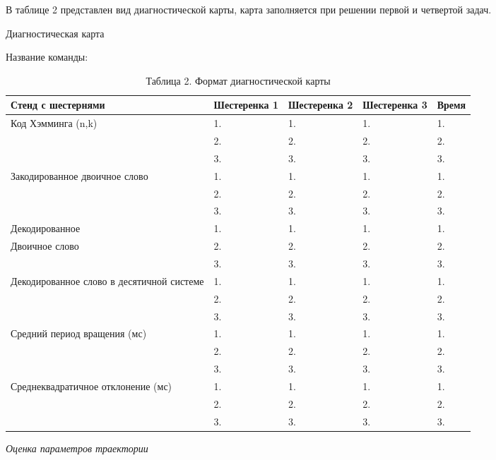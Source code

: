 В таблице 2 представлен вид диагностической карты, карта заполняется при решении первой и четвертой задач.

\begin{table}[H]
    \center
    \caption{Таблица 2. Формат диагностической карты}
    Диагностическая карта

    Название команды: \underline{\hspace{3cm}}
    \begin{tabular}{|p{4cm}|l|l|l|l|}
        \hline
        Стенд с шестернями & Шестеренка 1	&Шестеренка 2&	Шестеренка 3&	Время \\
        \hline
        Код Хэмминга (n,k)	& 1. & 1. & 1. & 1. \\
        & 2. & 2. & 2. & 2. \\
        & 3. & 3. & 3. & 3. \\
        \hline
        Закодированное двоичное слово & 1. & 1. & 1. & 1. \\
        & 2. & 2. & 2. & 2. \\
        & 3. & 3. & 3. & 3. \\
        \hline
        Декодированное & 1. & 1. & 1. & 1. \\
        Двоичное слово & 2. & 2. & 2. & 2. \\
        & 3. & 3. & 3. & 3. \\
        \hline       
        Декодированное слово в десятичной системе 	& 1. & 1. & 1. & 1. \\
        & 2. & 2. & 2. & 2. \\
        & 3. & 3. & 3. & 3. \\
        \hline
        Средний период вращения (мс) & 1. & 1. & 1. & 1. \\
        & 2. & 2. & 2. & 2. \\
        & 3. & 3. & 3. & 3. \\
        \hline 
        Среднеквадратичное отклонение (мс) & 1. & 1. & 1. & 1. \\
        & 2. & 2. & 2. & 2. \\
        & 3. & 3. & 3. & 3. \\
        \hline
    \end{tabular}
\end{table}

\textit{Оценка параметров траектории}

